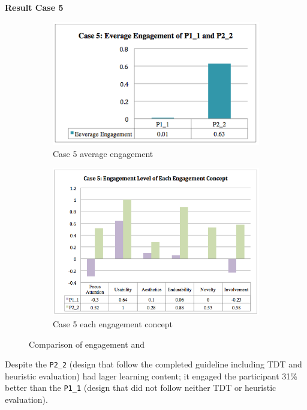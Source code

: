 \textbf{Result Case 5} 
\begin{figure}[!hbt]\centering
    \begin{subfigure}{0.7\textwidth}
 \includegraphics[width=\textwidth]{case5a}
 \caption{Case 5 average engagement}
    \end{subfigure}\hspace{0.1\textwidth}
    \begin{subfigure}{1.0\textwidth}
\includegraphics[width=\textwidth]{case5b}
  \caption{Case 5 each engagement concept}
    \end{subfigure}
    \caption{Comparison of engagement   and }
\end{figure}

Despite the \verb|P2_2| (design that follow the completed guideline including TDT and heuristic evaluation) had lager learning content; it engaged the participant 31\% better than the \verb|P1_1| (design that did not follow neither TDT or heuristic evaluation). 

